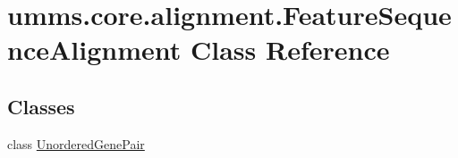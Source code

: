 \hypertarget{classumms_1_1core_1_1alignment_1_1_feature_sequence_alignment}{\section{umms.\+core.\+alignment.\+Feature\+Sequence\+Alignment Class Reference}
\label{classumms_1_1core_1_1alignment_1_1_feature_sequence_alignment}
}
\subsection*{Classes}
\begin{DoxyCompactItemize}
\item 
class \hyperlink{classumms_1_1core_1_1alignment_1_1_feature_sequence_alignment_1_1_unordered_gene_pair}{Unordered\+Gene\+Pair}
\end{DoxyCompactItemize}
